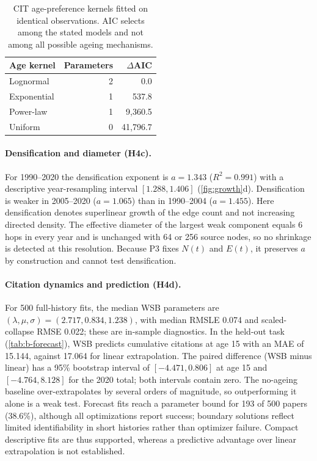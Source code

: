 \begin{table}[t]
\centering\small
\setlength{\tabcolsep}{4pt}
\begin{tabular*}{\columnwidth}{@{\extracolsep{\fill}}lrr@{}}
\toprule Age kernel & Parameters & $\Delta$AIC\\
\midrule
Lognormal & 2 & 0.0\\
Exponential & 1 & 537.8\\
Power-law & 1 & 9,360.5\\
Uniform & 0 & 41,796.7\\
\bottomrule
\end{tabular*}
\caption{CIT age-preference kernels fitted on identical observations. AIC selects among
the stated models and not among all possible ageing mechanisms.}
\label{tab:b-age-models}
\end{table}

\paragraph{Densification and diameter (H4c).}
For 1990--2020 the densification exponent is $a=1.343$ ($R^2=0.991$) with a descriptive
year-resampling interval $[1.288,1.406]$ (\cref{fig:growth}d). Densification is weaker in
2005--2020 ($a=1.065$) than in 1990--2004 ($a=1.455$). Here densification denotes
superlinear growth of the edge count and not increasing directed density. The effective
diameter of the largest weak component equals 6 hops in every year and is unchanged with
64 or 256 source nodes, so no shrinkage is detected at this resolution. Because P3 fixes
$N(t)$ and $E(t)$, it preserves $a$ by construction and cannot test densification.

\paragraph{Citation dynamics and prediction (H4d).}
For 500 full-history fits, the median WSB parameters are
$(\lambda,\mu,\sigma)=(2.717,0.834,1.238)$, with median RMSLE 0.074 and scaled-collapse RMSE
0.022; these are in-sample diagnostics. In the held-out task (\cref{tab:b-forecast}), WSB
predicts cumulative citations at age 15 with an MAE of 15.144, against 17.064 for linear
extrapolation. The paired difference (WSB minus linear) has a 95\% bootstrap interval of
$[-4.471,0.806]$ at age 15 and $[-4.764,8.128]$ for the 2020 total; both intervals contain
zero. The no-ageing baseline over-extrapolates by several orders of magnitude, so
outperforming it alone is a weak test. Forecast fits reach a parameter bound for 193 of 500
papers (38.6\%), although all optimizations report success; boundary solutions reflect limited
identifiability in short histories rather than optimizer failure. Compact descriptive fits
are thus supported, whereas a predictive advantage over linear extrapolation is not
established.

